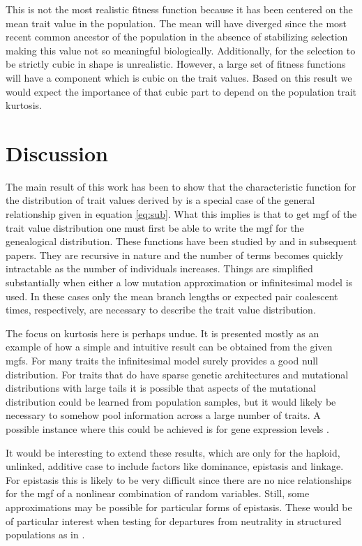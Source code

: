 \documentclass{article}
\begin{document}
This is not the most realistic fitness function because it has been centered on
the mean trait value in the population. The mean will have diverged since the
most recent common ancestor of the population in the absence of stabilizing
selection making this value not so meaningful biologically. Additionally, for
the selection to be strictly cubic in shape is unrealistic. However, a large set
of fitness functions will have a component which is cubic on the trait values.
Based on this result we would expect the importance of that cubic part to depend
on the population trait kurtosis.
\section{Discussion}
The main result of this work has been to show that the characteristic function
for the distribution of trait values derived by \citet{Schraiber2015} is a
special case of the general relationship given in equation \eqref{eq:sub}. What
this implies is that to get mgf of the trait value distribution one must first
be able to write the mgf for the genealogical distribution. These functions have
been studied by \citet{Lohse2011} and in subsequent papers. They are recursive
in nature and the number of terms becomes quickly intractable as the number of
individuals increases. Things are simplified substantially when either a low
mutation approximation or infinitesimal model is used. In these cases only the
mean branch lengths or expected pair coalescent times, respectively, are
necessary to describe the trait value distribution.

The focus on kurtosis here is perhaps undue. It is presented mostly as an
example of how a simple and intuitive result can be obtained from the given
mgfs. For many traits the infinitesimal model surely provides a good null
distribution. For traits that do have sparse genetic architectures and
mutational distributions with large tails it is possible that aspects of the
mutational distribution could be learned from population samples, but it would
likely be necessary to somehow pool information across a large number of traits.
A possible instance where this could be achieved is for gene expression levels
\citep{Wheeler2016}.

It would be interesting to extend these results, which are only for the haploid,
unlinked, additive case to include factors like dominance, epistasis and
linkage. For epistasis this is likely to be very difficult since there are no
nice relationships for the mgf of a nonlinear combination of random variables.
Still, some approximations may be possible for particular forms of epistasis.
These would be of particular interest when testing for departures from
neutrality in structured populations as in \citet{Ovaskainen2011}.
\end{document}
